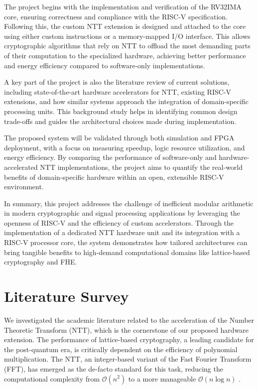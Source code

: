 \documentclass[a4paper, 12pt, titlepage]{article}
\begin{document}
The project begins with the implementation and verification of the RV32IMA core, ensuring correctness and compliance with the RISC-V specification. Following this, the custom NTT extension is designed and attached to the core using either custom instructions or a memory-mapped I/O interface. This allows cryptographic algorithms that rely on NTT to offload the most demanding parts of their computation to the specialized hardware, achieving better performance and energy efficiency compared to software-only implementations.

A key part of the project is also the literature review of current solutions, including state-of-the-art hardware accelerators for NTT, existing RISC-V extensions, and how similar systems approach the integration of domain-specific processing units. This background study helps in identifying common design trade-offs and guides the architectural choices made during implementation.

The proposed system will be validated through both simulation and FPGA deployment, with a focus on measuring speedup, logic resource utilization, and energy efficiency. By comparing the performance of software-only and hardware-accelerated NTT implementations, the project aims to quantify the real-world benefits of domain-specific hardware within an open, extensible RISC-V environment.

In summary, this project addresses the challenge of inefficient modular arithmetic in modern cryptographic and signal processing applications by leveraging the openness of RISC-V and the efficiency of custom accelerators. Through the implementation of a dedicated NTT hardware unit and its integration with a RISC-V processor core, the system demonstrates how tailored architectures can bring tangible benefits to high-demand computational domains like lattice-based cryptography and FHE.

\newpage

\section{Literature Survey}
We investigated the academic literature related to the acceleration of the Number Theoretic Transform (NTT), which is the cornerstone of our proposed hardware extension. The performance of lattice-based cryptography, a leading candidate for the post-quantum era, is critically dependent on the efficiency of polynomial multiplication. The NTT, an integer-based variant of the Fast Fourier Transform (FFT), has emerged as the de-facto standard for this task, reducing the computational complexity from $\mathcal{O}(n^2)$ to a more manageable $\mathcal{O}(n \log n)$ \cite{Satriawan2023Conceptual}. 
\end{document}
